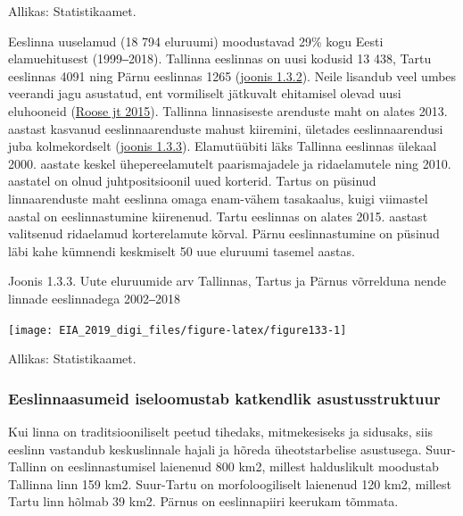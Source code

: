 \documentclass[estonian,]{article}
\begin{document}
\begin{imgsource}
{Allikas:} Statistikaamet.
\end{imgsource}

Eeslinna uuselamud (18 794 eluruumi) moodustavad 29\% kogu Eesti elamuehitusest (1999‒2018). Tallinna eeslinnas on uusi kodusid 13 438, Tartu eeslinnas 4091 ning Pärnu eeslinnas 1265 (\protect\hyperlink{figure132}{joonis 1.3.2}). Neile lisandub veel umbes veerandi jagu asustatud, ent vormiliselt jätkuvalt ehitamisel olevad uusi eluhooneid (\protect\hyperlink{Roose2015}{Roose jt 2015}). Tallinna linnasiseste arenduste maht on alates 2013. aastast kasvanud eeslinnaarenduste mahust kiiremini, ületades eeslinnaarendusi juba kolmekordselt (\protect\hyperlink{figure133}{joonis 1.3.3}). Elamutüübiti läks Tallinna eeslinnas ülekaal 2000. aastate keskel ühepereelamutelt paarismajadele ja ridaelamutele ning 2010. aastatel on olnud juhtpositsioonil uued korterid. Tartus on püsinud linnaarenduste maht eeslinna omaga enam-vähem tasakaalus, kuigi viimastel aastal on eeslinnastumine kiirenenud. Tartu eeslinnas on alates 2015. aastast valitsenud ridaelamud korterelamute kõrval. Pärnu eeslinnastumine on püsinud läbi kahe kümnendi keskmiselt 50 uue eluruumi tasemel aastas.

{Joonis 1.3.3.} Uute eluruumide arv Tallinnas, Tartus ja Pärnus võrrelduna nende linnade eeslinnadega 2002‒2018

\begin{center}\texttt{[image: EIA\_2019\_digi\_files/figure-latex/figure133-1]} \end{center}

\begin{imgsource}
{Allikas:} Statistikaamet.
\end{imgsource}

\hypertarget{eeslinnaasumeid-iseloomustab-katkendlik-asustusstruktuur}{%
\subsubsection*{Eeslinnaasumeid iseloomustab katkendlik asustusstruktuur}\label{eeslinnaasumeid-iseloomustab-katkendlik-asustusstruktuur}}

Kui linna on traditsiooniliselt peetud tihedaks, mitmekesiseks ja sidusaks, siis eeslinn vastandub keskuslinnale hajali ja hõreda üheotstarbelise asustusega. Suur-Tallinn on eeslinnastumisel laienenud 800 km2, millest halduslikult moodustab Tallinna linn 159 km2. Suur-Tartu on morfoloogiliselt laienenud 120 km2, millest Tartu linn hõlmab 39 km2. Pärnus on eeslinnapiiri keerukam tõmmata.
\end{document}
